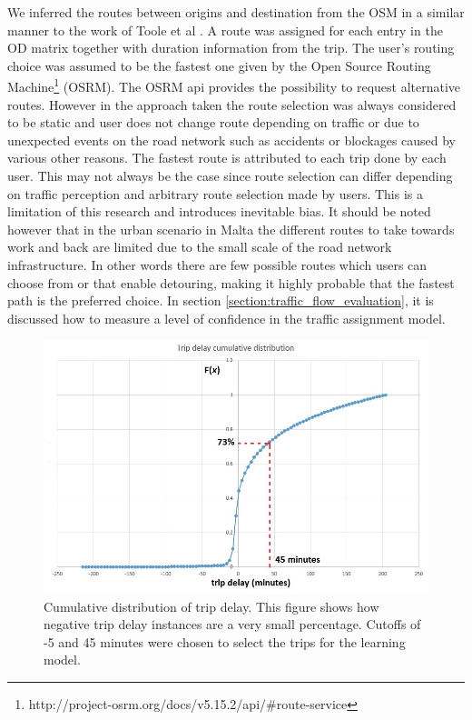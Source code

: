 \documentclass[12pt, a4paper]{report}
\theoremstyle{definition}
\theoremstyle{definition}%
\theoremstyle{definition}%
\theoremstyle{definition}%
\theoremstyle{definition}%
\theoremstyle{definition}%
\begin{document}
We inferred the routes between origins and destination from the OSM in a similar manner to the work of Toole et al \cite{Toole2015}. A route was assigned for each entry in the OD matrix together with duration information from the trip. The user's routing choice was assumed to be the fastest one given by the Open Source Routing Machine\footnote{http://project-osrm.org/docs/v5.15.2/api/\#route-service} (OSRM). The OSRM api provides the possibility to request alternative routes. However in the approach taken the route selection was always considered to be static and user does not change route depending on traffic or due to  unexpected events on the road network such as accidents or blockages caused by various other reasons. The fastest route is attributed to each trip done by each user. This may not always be the case since route selection can differ depending on traffic perception and arbitrary route selection made by users. This is a limitation of this research and introduces inevitable bias. It should be noted however that in the urban scenario in Malta the different routes to take towards work and back are limited due to the small scale of the road network infrastructure. In other words there are few possible routes which users can choose from or that enable detouring, making it highly probable that the fastest path is the preferred choice. In section \ref{section:traffic_flow_evaluation}, it is discussed how to measure a level of confidence in the traffic assignment model.


\begin{figure}[hp]	
	\includegraphics[scale=0.60]{Trip_delay_cumm_distribution.jpg}
	\centering
	\caption[Trip delay cumulative distribution]{Cumulative distribution of trip delay. This figure shows how negative trip delay instances are a very small percentage. Cutoffs  of -5 and 45 minutes were chosen to select the trips for the learning model.  }
	\label{fig:trip_delay_cum_distribution}
\end{figure}
\end{document}
